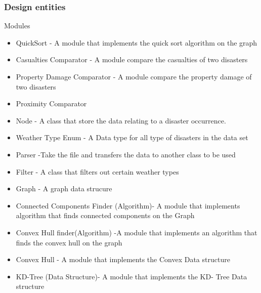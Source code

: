 \documentclass[12pt]{article}
\begin{document}
            \subsubsection{Design entities}
                 Modules 
                \begin{itemize}
                    \item QuickSort - A module that implements the quick sort algorithm on the graph 
                    \item Casualties Comparator - A module compare the casualties of two disasters 
                    \item Property Damage Comparator - A module compare the property damage of two disasters 
                    \item Proximity Comparator 
                    \item Node - A class that store the data relating to a disaster occurrence. 
                    \item Weather Type Enum - A Data type for all type of disasters in the data set
                    \item Parser -Take the file and transfers the data to another class to be used 
                    \item Filter - A class that filters out certain weather types 
                    \item Graph - A graph data strucure 
                    \item Connected Components Finder (Algorithm)- A module that implements algorithm that finds connected components on the Graph
                    \item Convex Hull finder(Algorithm) -A module that implements an algorithm that finds the convex hull on the graph
                    \item Convex Hull - A module that implements the Convex Data structure 
                    \item KD-Tree (Data Structure)- A module that implements the KD- Tree Data structure 
                \end{itemize}
                
\end{document}

